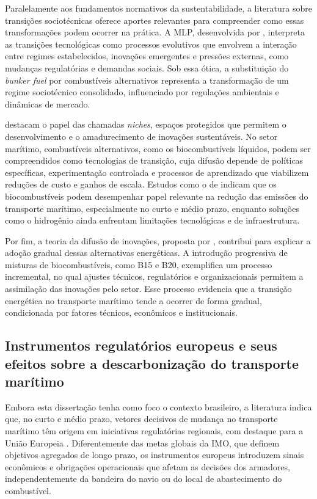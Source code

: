 Paralelamente aos fundamentos normativos da sustentabilidade, a literatura sobre transições sociotécnicas oferece aportes relevantes para compreender como essas transformações podem ocorrer na prática. A \gls{MLP}, desenvolvida por \citet{geels_technological_2002,geels_multi-level_2011}, interpreta as transições tecnológicas como processos evolutivos que envolvem a interação entre regimes estabelecidos, inovações emergentes e pressões externas, como mudanças regulatórias e demandas sociais. Sob essa ótica, a substituição do \emph{bunker fuel} por combustíveis alternativos representa a transformação de um regime sociotécnico consolidado, influenciado por regulações ambientais e dinâmicas de mercado.

\citet{schot_strategic_2008} destacam o papel das chamadas \emph{niches}, espaços protegidos que permitem o desenvolvimento e o amadurecimento de inovações sustentáveis. No setor marítimo, combustíveis alternativos, como os biocombustíveis líquidos, podem ser compreendidos como tecnologias de transição, cuja difusão depende de políticas específicas, experimentação controlada e processos de aprendizado que viabilizem reduções de custo e ganhos de escala. Estudos como o de \citet{international_council_on_clean_transportation_potential_2021} indicam que os biocombustíveis podem desempenhar papel relevante na redução das emissões do transporte marítimo, especialmente no curto e médio prazo, enquanto soluções como o hidrogênio ainda enfrentam limitações tecnológicas e de infraestrutura.

Por fim, a teoria da difusão de inovações, proposta por \citet{rogers_diffusion_2003}, contribui para explicar a adoção gradual dessas alternativas energéticas. A introdução progressiva de misturas de biocombustíveis, como B15 e B20, exemplifica um processo incremental, no qual ajustes técnicos, regulatórios e organizacionais permitem a assimilação das inovações pelo setor. Esse processo evidencia que a transição energética no transporte marítimo tende a ocorrer de forma gradual, condicionada por fatores técnicos, econômicos e institucionais.

\subsection{Instrumentos regulatórios europeus e seus efeitos sobre a descarbonização do transporte marítimo}

Embora esta dissertação tenha como foco o contexto brasileiro, a literatura indica que, no curto e médio prazo, vetores decisivos de mudança no transporte marítimo têm origem em iniciativas regulatórias regionais, com destaque para a União Europeia \citep{psaraftis_comparative_2021,eu_reg_2023_957,eu_reg_2023_1805}. Diferentemente das metas globais da \gls{IMO}, que definem objetivos agregados de longo prazo, os instrumentos europeus introduzem sinais econômicos e obrigações operacionais que afetam as decisões dos armadores, independentemente da bandeira do navio ou do local de abastecimento do combustível.

